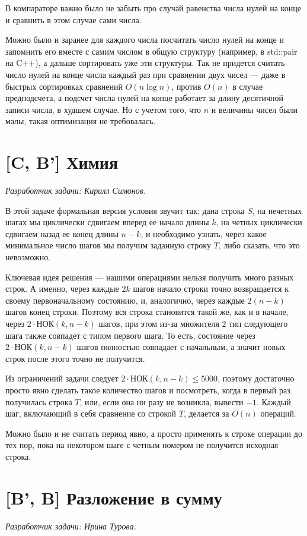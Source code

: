 \documentclass[12pt]{article}
\theoremstyle{definition}
\begin{document}
В компараторе важно было не забыть про случай равенства числа нулей на конце и сравнить
в этом случае сами числа.

Можно было и заранее для каждого числа посчитать число нулей на конце и запомнить его
вместе с самим числом в общую структуру (например, в std::pair на C++), а дальше
сортировать уже эти структуры. Так не придется считать число нулей на конце числа
каждый раз при сравнении двух чисел --- даже в быстрых сортировках сравнений $O(n \log n)$, против $O(n)$ в случае предподсчета, а подсчет числа нулей на конце работает за
длину десятичной записи числа, в худшем случае. Но с учетом того, что $n$ и величины чисел
были малы, такая оптимизация не требовалась.

\section{[C, B'] Химия}
\textit{Разработчик задачи: Кирилл Симонов.}

В этой задаче формальная версия условия звучит так: дана строка $S$, на нечетных шагах
мы циклически сдвигаем вперед ее начало длины $k$, на четных циклически сдвигаем назад
ее конец длины $n - k$, и необходимо узнать, через какое минимальное число шагов мы получим заданную строку $T$, либо сказать, что это невозможно.

Ключевая идея решения --- нашими операциями нельзя получить много разных строк.
А именно, через каждые $2k$ шагов начало строки точно возвращается к
своему первоначальному состоянию, и, аналогично,
через каждые $2(n - k)$ шагов конец строки. Поэтому вся строка становится такой же, как и в начале, через $2\cdot \text{НОК}(k, n - k)$ шагов, при этом из-за множителя $2$
тип следующего шага также совпадет с типом первого шага.
То есть, состояние через $2\cdot \text{НОК}(k, n - k)$ шагов полностью совпадает с начальным,
а значит новых строк после этого точно не получится.

Из ограничений задачи следует $2\cdot \text{НОК}(k, n - k) \le 5000$, поэтому
достаточно просто явно сделать такое количество шагов и посмотреть, когда в первый раз получилась строка $T$, или, если она ни разу не возникла, вывести $-1$. Каждый шаг, включающий в себя сравнение со строкой $T$, делается за $O(n)$ операций.

Можно было и не считать период явно, а просто применять к строке операции до тех пор,
пока на некотором шаге с четным номером не получится исходная строка.

\section{[B', B] Разложение в сумму}
\textit{Разработчик задачи: Ирина Турова.}
\end{document}
